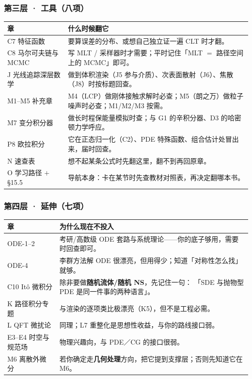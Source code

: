 \subsubsection{第三层 · 工具（八项）}

\begin{center}
\begin{tabular}{L{2.5cm}L{12.0cm}}
\toprule
\textbf{章} & \textbf{什么时候翻它} \\
\midrule
C7 特征函数 & 要算误差的分布、或想自己独立证一遍 CLT 时才翻。 \\
C8 马尔可夫链与 MCMC & 写 MLT / 采样器时才需要；平时记住「MLT $=$ 路径空间上的 MCMC」即可。 \\
J 光线追踪深层数学 & 做到体积渲染（J5 参与介质）、次表面散射（J6）、焦散（J8）时按标题回查。 \\
M1--M5 补充章 & M4（LCP）做刚体接触求解时必查；M5（朗之万）做粒子噪声时必查；M1/M2/M3 按需。 \\
M7 变分积分器 & 做长时程保能量模拟时查；与 G1 的辛积分器、D3 的哈密顿力学呼应。 \\
P8 欧拉积分 & 它在正态归一化（C2）、PDE 特殊函数、组合估计处冒出来，届时回查。 \\
N 速查表 & 想不起某条公式时先翻这里，翻不到再回原章。 \\
O 学习路径 $+$ §15.5 & 导航本身：卡在某节时先查教材对照表，再决定翻哪本书。 \\
\bottomrule
\end{tabular}
\end{center}

\subsubsection{第四层 · 延伸（七项）}

\begin{center}
\begin{tabular}{L{2.5cm}L{12.0cm}}
\toprule
\textbf{章} & \textbf{为什么现在不投入} \\
\midrule
ODE-1--2 & 考研/高数级 ODE 套路与系统理论——你的底子够用，需要时回查即可。 \\
ODE-4 & 李群方法解 ODE 很漂亮，但用得少；知道「对称性怎么找」就够。 \\
C10 Itô 微积分 & 除非要做\textbf{随机流体/随机 NS}，先记住一句：
「SDE 与抛物型 PDE 是同一件事的两种语言」。 \\
K 路径积分专题 & 与渲染的逐项类比极漂亮（K5），但不是工程必需。 \\
L QFT 微扰论 & 同理；L7 重整化是思想性收益，与你的路线接口弱。 \\
E3--E4 时空与规范场 & 物理兴趣向，与 PDE／CG 的接口很弱。 \\
M6 离散外微分 & 若你确定走\textbf{几何处理}方向，把它提到支撑层；否则先知道它在 M6。 \\
\bottomrule
\end{tabular}
\end{center}

